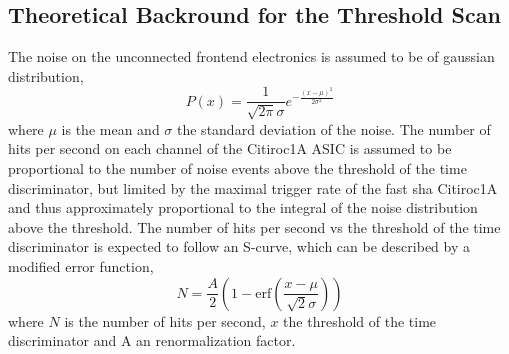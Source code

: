 \subsection{Theoretical Backround for the Threshold Scan} \label{sec:noise_theory}
The noise on the unconnected frontend electronics is assumed to be of gaussian distribution,
\begin{equation}
    P(x) = \frac{1}{\sqrt{2\pi}\sigma}e^{-\frac{(x-\mu)^2}{2\sigma^2}}
\end{equation}
where $\mu$ is the mean and $\sigma$ the standard deviation of the noise.\autocite{Theorynoise}
\newline
The number of hits per second on each channel of the Citiroc1A ASIC is assumed to be proportional to the number of noise events above the threshold of the time discriminator, but limited by the maximal trigger rate of the fast sha Citiroc1A
and thus approximately proportional to the integral of the noise distribution above the threshold.\autocite{Theorynoise}
\newline
The number of hits per second vs the threshold of the time discriminator is expected to follow an S-curve, which can be described by a modified error function,
\begin{equation}
    N = \frac{A}{2} \left( 1 - \text{erf} \left( \frac{x - \mu}{\sqrt{2}\sigma} \right) \right)
\end{equation}
where $N$ is the number of hits per second, $x$ the threshold of the time discriminator and A an renormalization factor.\autocite{Theorynoise}
